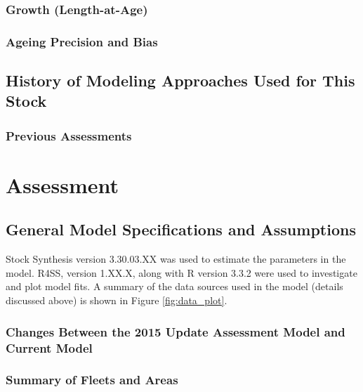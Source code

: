 \documentclass[12pt,]{article}
\begin{document}
\subsubsection{Growth (Length-at-Age)}\label{growth-length-at-age}

\subsubsection{Ageing Precision and
Bias}\label{ageing-precision-and-bias}

\subsection{History of Modeling Approaches Used for This
Stock}\label{history-of-modeling-approaches-used-for-this-stock}

\subsubsection{Previous Assessments}\label{previous-assessments}

\section{Assessment}\label{assessment}

\subsection{General Model Specifications and
Assumptions}\label{general-model-specifications-and-assumptions}

Stock Synthesis version 3.30.03.XX was used to estimate the parameters
in the model. R4SS, version 1.XX.X, along with R version 3.3.2 were used
to investigate and plot model fits. A summary of the data sources used
in the model (details discussed above) is shown in Figure
\ref{fig:data_plot}.

\subsubsection{Changes Between the 2015 Update Assessment Model and
Current
Model}\label{changes-between-the-2015-update-assessment-model-and-current-model}

\subsubsection{Summary of Fleets and
Areas}\label{summary-of-fleets-and-areas}
\end{document}
